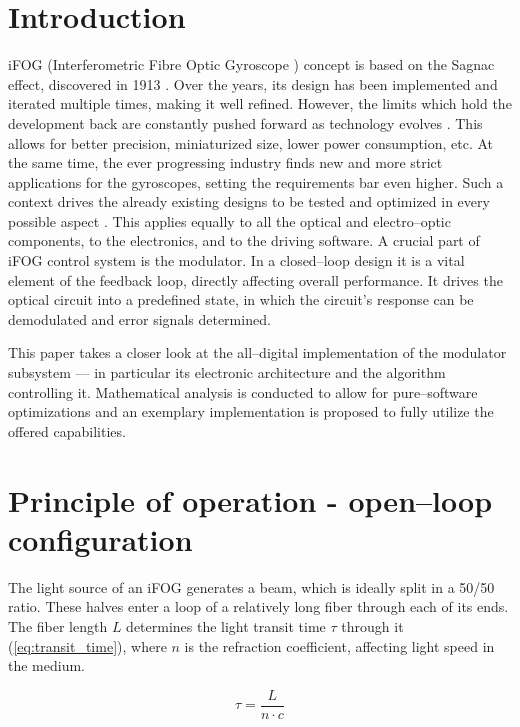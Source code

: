 \documentclass[journal,twoside,web]{ieeecolor}
\begin{document}
\section{Introduction}
iFOG (Interferometric Fibre Optic Gyroscope \cite{culshaw2006optical, bergh1984overview}) concept is based on the Sagnac effect, discovered in 1913 \cite{sagnac1913ether, post1967sagnac}. Over the years, its design has been implemented and iterated multiple times, making it well refined. However, the limits which hold the development back are constantly pushed forward as technology evolves \cite{ma2020configuration}. This allows for better precision, miniaturized size, lower power consumption, etc. At the same time, the ever progressing industry finds new and more strict applications for the gyroscopes, setting the requirements bar even higher. Such a context drives the already existing designs to be tested and optimized in every possible aspect \cite{liadvances, smailov2026fiber, tashtay2025fiber, niespodziany2021detector}. This applies equally to all the optical and electro--optic components, to the electronics, and to the driving software. A crucial part of iFOG control system is the modulator. In a closed--loop design \cite{pavlath1996closed} it is a vital element of the feedback loop, directly affecting overall performance. It drives the optical circuit into a predefined state, in which the circuit's response can be demodulated and error signals determined. 

This paper takes a closer look at the all--digital implementation of the modulator subsystem — in particular its electronic architecture and the algorithm controlling it. Mathematical analysis is conducted to allow for pure--software optimizations and an exemplary implementation is proposed to fully utilize the offered capabilities.

\section{Principle of operation - open--loop configuration}
The light source of an iFOG generates a beam, which is ideally split in a 50/50 ratio. These halves enter a loop of a relatively long fiber through each of its ends. The fiber length $L$ determines the light transit time $\tau$ through it (\ref{eq:transit_time}), where $n$ is the refraction coefficient, affecting light speed in the medium.

\begin{equation}
    \tau = \frac{L}{n \cdot c}
    \label{eq:transit_time}
\end{equation}
\end{document}
